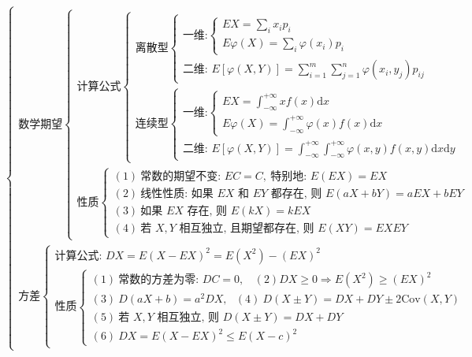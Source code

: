 \documentclass[lang=cn,11pt]{elegantbook}
\begin{document}
{\small
\[
\begin{cases}
\text{数学期望}
\begin{cases}
\text{计算公式}
\begin{cases}
\text{离散型}
\begin{cases}
\text{一维:}
\begin{cases}
EX = \sum\limits_{i} x_i p_i \\
E\varphi(X) = \sum\limits_{i} \varphi(x_i) p_i
\end{cases} \\
\text{二维: } E[\varphi(X,Y)] = \sum\limits_{i=1}^{m} \sum\limits_{j=1}^{n} \varphi(x_i,y_j) p_{ij}
\end{cases} \\
\text{连续型}
\begin{cases}
\text{一维:}
\begin{cases}
EX = \int_{-\infty}^{+\infty} x f(x) \mathrm{d}x \\
E\varphi(X) = \int_{-\infty}^{+\infty} \varphi(x) f(x) \mathrm{d}x
\end{cases} \\
\text{二维: } E[\varphi(X,Y)] = \int_{-\infty}^{+\infty} \int_{-\infty}^{+\infty} \varphi(x,y) f(x,y) \mathrm{d}x\mathrm{d}y
\end{cases}
\end{cases} \\
\text{性质}
\begin{cases}
(1)\ \text{常数的期望不变: } EC=C,\ \text{特别地: } E(EX)=EX \\
(2)\ \text{线性性质: 如果 } EX \text{ 和 } EY \text{ 都存在, 则 } E(aX+bY)=aEX+bEY \\
(3)\ \text{如果 } EX \text{ 存在, 则 } E(kX)=kEX \\
(4)\ \text{若 } X,Y \text{ 相互独立, 且期望都存在, 则 } E(XY)=EXEY
\end{cases}
\end{cases} \\
\text{方差}
\begin{cases}
\text{计算公式: } DX=E(X-EX)^2=E(X^2)-(EX)^2 \\
\text{性质}
\begin{cases}
(1)\ \text{常数的方差为零: } DC=0,~~~~ (2) DX\geqslant0 \Rightarrow E(X^2)\geqslant (EX)^2 \\
(3)\ D(aX+b)=a^2 DX,~~~ (4)\ D(X\pm Y)=DX+DY\pm 2\text{Cov}(X,Y) \\
(5)\ \text{若 } X,Y \text{ 相互独立, 则 } D(X\pm Y)=DX+DY \\
(6)\ DX=E(X-EX)^2\leqslant E(X-c)^2

\end{cases}
\end{cases}
\end{cases}\]}
\end{document}
